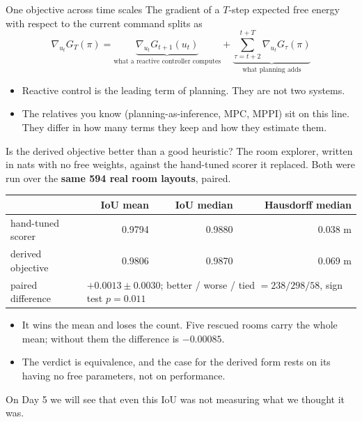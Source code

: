 \begin{frame}{One objective across time scales}
  The gradient of a $T$-step expected free energy with respect to the current command splits as
  \[
    \nabla_{u_t} G_T(\pi)
      = \underbrace{\nabla_{u_t} G_{t+1}(u_t)}_{\text{what a reactive controller computes}}
      + \underbrace{\sum_{\tau=t+2}^{t+T}\nabla_{u_t} G_\tau(\pi)}_{\text{what planning adds}}
  \]
  \begin{itemize}
    \item Reactive control is the leading term of planning. They are not two systems.
    \item The relatives you know (planning-as-inference, MPC, MPPI) sit on this line. They differ in
          how many terms they keep and how they estimate them.
  \end{itemize}
\end{frame}


\begin{frame}{Is the derived objective better than a good heuristic?}
  The room explorer, written in nats with no free weights, against the hand-tuned scorer it
  replaced. Both were run over the \textbf{same 594 real room layouts}, paired.
  \vspace{0.3em}
  \begin{center}\small
  \begin{tabular}{@{}l r r r@{}}
    \toprule
     & IoU mean & IoU median & Hausdorff median \\
    \midrule
    hand-tuned scorer & 0.9794 & 0.9880 & 0.038 m \\
    derived objective & 0.9806 & 0.9870 & 0.069 m \\
    \midrule
    paired difference & \multicolumn{3}{l}{$+0.0013\pm0.0030$; better / worse / tied $=238/298/58$, sign test $p=0.011$} \\
    \bottomrule
  \end{tabular}
  \end{center}
  \begin{itemize}\small
    \item It wins the mean and loses the count. Five rescued rooms carry the whole mean; without
          them the difference is $-0.00085$.
    \item The verdict is \alert{equivalence}, and the case for the derived form rests on its having
          no free parameters, not on performance.
  \end{itemize}
  \small On Day 5 we will see that even this IoU was not measuring what we thought it was.
\end{frame}

